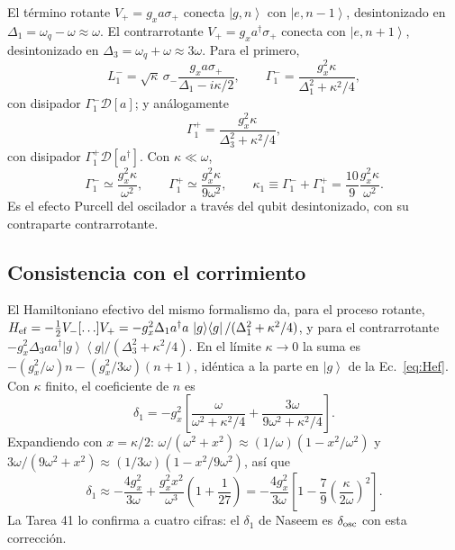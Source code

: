 \documentclass[11pt]{report}
\newcommand{\ket}[1]{\left|#1\right\rangle}
\newcommand{\bra}[1]{\left\langle#1\right|}
\newcommand{\spl}{\sigma_{+}}
\newcommand{\smi}{\sigma_{-}}
\newcommand{\Pg}{\ket{g}\!\bra{g}}
\newcommand{\D}{\mathcal{D}}
\begin{document}
El t\'ermino rotante $V_{+}=g_{x}a\spl$ conecta $\ket{g,n}$ con $\ket{e,n-1}$, desintonizado en $\Delta_{1}=\omega_{q}-\omega\approx\omega$. El contrarrotante $V_{+}=g_{x}a^{\dagger}\spl$ conecta con $\ket{e,n+1}$, desintonizado en $\Delta_{3}=\omega_{q}+\omega\approx3\omega$. Para el primero,
\begin{equation}
L_{1}^{-}=\sqrt\kappa\,\smi\frac{g_{x}a\spl}{\Delta_{1}-i\kappa/2},\qquad \Gamma_{1}^{-}=\frac{g_{x}^{2}\kappa}{\Delta_{1}^{2}+\kappa^{2}/4},
\end{equation}
con disipador $\Gamma_{1}^{-}\D[a]$; y an\'alogamente
\begin{equation}
\Gamma_{1}^{+}=\frac{g_{x}^{2}\kappa}{\Delta_{3}^{2}+\kappa^{2}/4},
\end{equation}
con disipador $\Gamma_{1}^{+}\D[a^{\dagger}]$. Con $\kappa\ll\omega$,
\begin{equation}
\boxed{\Gamma_{1}^{-}\simeq\frac{g_{x}^{2}\kappa}{\omega^{2}},\qquad \Gamma_{1}^{+}\simeq\frac{g_{x}^{2}\kappa}{9\omega^{2}},\qquad \kappa_{1}\equiv\Gamma_{1}^{-}+\Gamma_{1}^{+}=\frac{10}{9}\frac{g_{x}^{2}\kappa}{\omega^{2}}}.
\end{equation}
Es el efecto Purcell del oscilador a trav\'es del qubit desintonizado, con su contraparte contrarrotante.

\subsection{Consistencia con el corrimiento}

El Hamiltoniano efectivo del mismo formalismo da, para el proceso rotante, $H_{\rm ef}=-\tfrac12 V_{-}[\ldots]V_{+}=-g_{x}^{2}\Delta_{1}a^{\dagger}a\,\Pg/(\Delta_{1}^{2}+\kappa^{2}/4)$, y para el contrarrotante $-g_{x}^{2}\Delta_{3}aa^{\dagger}\Pg/(\Delta_{3}^{2}+\kappa^{2}/4)$. En el l\'imite $\kappa\to0$ la suma es $-(g_{x}^{2}/\omega)n-(g_{x}^{2}/3\omega)(n+1)$, id\'entica a la parte en $\ket{g}$ de la Ec.~\eqref{eq:Hef}. Con $\kappa$ finito, el coeficiente de $n$ es
\begin{equation}
\delta_{1}=-g_{x}^{2}\left[\frac{\omega}{\omega^{2}+\kappa^{2}/4}+\frac{3\omega}{9\omega^{2}+\kappa^{2}/4}\right].
\end{equation}
Expandiendo con $x=\kappa/2$: $\omega/(\omega^{2}+x^{2})\approx(1/\omega)(1-x^{2}/\omega^{2})$ y $3\omega/(9\omega^{2}+x^{2})\approx(1/3\omega)(1-x^{2}/9\omega^{2})$, as\'i que
\begin{equation}
\delta_{1}\approx-\frac{4g_{x}^{2}}{3\omega}+\frac{g_{x}^{2}x^{2}}{\omega^{3}}\left(1+\frac{1}{27}\right)=-\frac{4g_{x}^{2}}{3\omega}\left[1-\frac{7}{9}\left(\frac{\kappa}{2\omega}\right)^{2}\right].
\end{equation}
La Tarea 41 lo confirma a cuatro cifras: el $\delta_{1}$ de Naseem es $\delta_{\rm osc}$ con esta correcci\'on.
\end{document}
